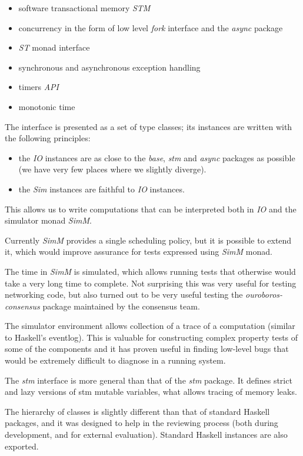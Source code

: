 \documentclass[11pt,a4paper]{article}
\begin{document}
\begin{itemize}
\item
  software transactional memory \emph{STM}
\item
  concurrency in the form of low level \emph{fork} interface and the
  \emph{async} package
\item
  \emph{ST} monad interface
\item
  synchronous and asynchronous exception handling
\item
  timers \emph{API}
\item
  monotonic time
\end{itemize}

The interface is presented as a set of type classes; its instances are
written with the following principles:

\begin{itemize}
\item
  the \emph{IO} instances are as close to the \emph{base}, \emph{stm}
  and \emph{async} packages as possible (we have very few places where
  we slightly diverge).
\item
  the \emph{Sim} instances are faithful to \emph{IO} instances.
\end{itemize}

This allows us to write computations that can be interpreted both in
\emph{IO} and the simulator monad \emph{SimM}.

Currently \emph{SimM} provides a single scheduling policy, but it is
possible to extend it, which would improve assurance for tests expressed
using \emph{SimM} monad.

The time in \emph{SimM} is simulated, which allows running tests that
otherwise would take a very long time to complete. Not surprising this
was very useful for testing networking code, but also turned out to be
very useful testing the \emph{ouroboros-consensus} package maintained by
the consensus team.

The simulator environment allows collection of a trace of a computation
(similar to Haskell's eventlog). This is valuable for constructing
complex property tests of some of the components and it has proven
useful in finding low-level bugs that would be extremely difficult to
diagnose in a running system.

The \emph{stm} interface is more general than that of the \emph{stm}
package. It defines strict and lazy versions of stm mutable variables,
what allows tracing of memory leaks.

The hierarchy of classes is slightly different than that of standard
Haskell packages, and it was designed to help in the reviewing process
(both during development, and for external evaluation). Standard Haskell
instances are also exported.
\end{document}
